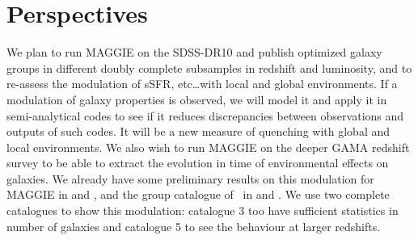 \section{Perspectives}
\label{sec:perspectives}

We plan to run MAGGIE on the SDSS-DR10 and publish optimized galaxy groups in
different doubly complete subsamples in redshift and luminosity, and to
re-assess the modulation of sSFR, etc\ldots with local and global environments.
If a modulation of galaxy properties is observed, we will model it and apply it
in semi-analytical codes to see if it reduces discrepancies between
observations and outputs of such codes. It will be a new measure of quenching
with global and local environments. We also wish to run MAGGIE on the deeper
GAMA redshift survey to be able to extract the evolution in time of
environmental effects on galaxies. We already have some preliminary results on
this modulation for MAGGIE in  and
, and the group catalogue of~\cite{Tempel+14} in
 and .
We use two complete catalogues to show this modulation: catalogue 3 too have
sufficient statistics in number of galaxies and catalogue 5 to see the
behaviour at larger redshifts.

